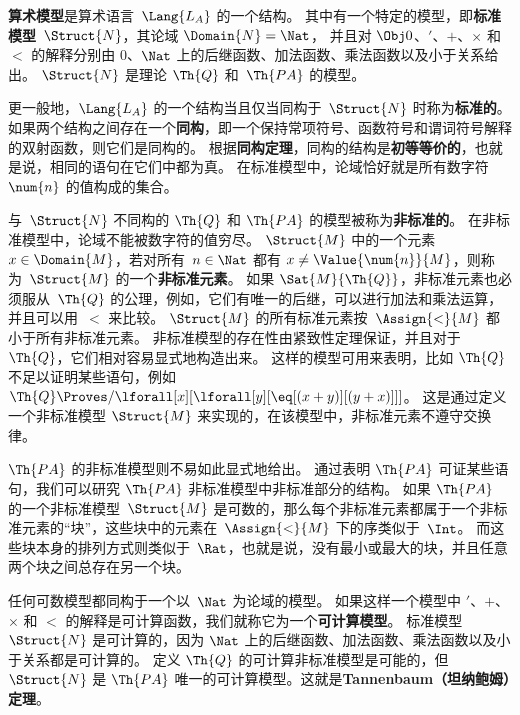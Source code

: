 \textbf{算术模型}是算术语言~$\Lang{L_A}$ 的一个结构。
其中有一个特定的模型，即\textbf{标准模型}~$\Struct{N}$，其论域 $\Domain{N} = \Nat$，
并且对 $\Obj 0$、$\prime$、$+$、$\times$ 和 $<$ 的解释分别由 $0$、$\Nat$ 上的后继函数、加法函数、乘法函数以及小于关系给出。
$\Struct{N}$ 是理论 $\Th{Q}$ 和~$\Th{PA}$ 的模型。

更一般地，$\Lang{L_A}$ 的一个结构当且仅当同构于~$\Struct{N}$ 时称为\textbf{标准的}。
如果两个结构之间存在一个\textbf{同构}，即一个保持常项符号、函数符号和谓词符号解释的双射函数，则它们是同构的。
根据\textbf{同构定理}，同构的结构是\textbf{初等等价的}，也就是说，相同的语句在它们中都为真。
在标准模型中，论域恰好就是所有数字符~$\num{n}$ 的值构成的集合。

与~$\Struct{N}$ 不同构的 $\Th{Q}$ 和 $\Th{PA}$ 的模型被称为\textbf{非标准的}。
在非标准模型中，论域不能被数字符的值穷尽。
$\Struct{M}$ 中的一个元素 $x \in \Domain{M}$，若对所有~$n \in \Nat$ 都有 $x \neq \Value{\num{n}}{M}$，则称为~$\Struct{M}$ 的一个\textbf{非标准元素}。
如果 $\Sat{M}{\Th{Q}}$，非标准元素也必须服从~$\Th{Q}$ 的公理，例如，它们有唯一的后继，可以进行加法和乘法运算，并且可以用~$<$ 来比较。
$\Struct{M}$ 的所有标准元素按~$\Assign{<}{M}$ 都小于所有非标准元素。
非标准模型的存在性由紧致性定理保证，并且对于 $\Th{Q}$，它们相对容易显式地构造出来。
这样的模型可用来表明，比如 $\Th{Q}$ 不足以证明某些语句，例如 $\Th{Q} \Proves/ \lforall[x][\lforall[y][\eq[(x+y)][(y+x)]]]$。
这是通过定义一个非标准模型 $\Struct{M}$ 来实现的，在该模型中，非标准元素不遵守交换律。

$\Th{PA}$ 的非标准模型则不易如此显式地给出。
通过表明 $\Th{PA}$ 可证某些语句，我们可以研究 $\Th{PA}$ 非标准模型中非标准部分的结构。
如果 $\Th{PA}$ 的一个非标准模型~$\Struct{M}$ 是可数的，那么每个非标准元素都属于一个非标准元素的“块”，这些块中的元素在~$\Assign{<}{M}$ 下的序类似于~$\Int$。
而这些块本身的排列方式则类似于~$\Rat$，也就是说，没有最小或最大的块，并且任意两个块之间总存在另一个块。

任何可数模型都同构于一个以~$\Nat$ 为论域的模型。
如果这样一个模型中 $\prime$、$+$、$\times$ 和 $<$ 的解释是可计算函数，我们就称它为一个\textbf{可计算模型}。
标准模型~$\Struct{N}$ 是可计算的，因为 $\Nat$ 上的后继函数、加法函数、乘法函数以及小于关系都是可计算的。
定义 $\Th{Q}$ 的可计算非标准模型是可能的，但 $\Struct{N}$ 是 $\Th{PA}$ 唯一的可计算模型。这就是\textbf{Tannenbaum（坦纳鲍姆）定理}。